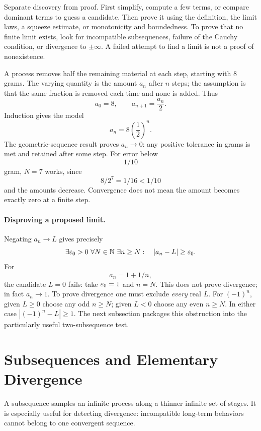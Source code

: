 \begin{remark}
Separate discovery from proof.  First simplify, compute a few terms, or
compare dominant terms to guess a candidate.  Then prove it using the
definition, the limit laws, a squeeze estimate, or monotonicity and
boundedness.  To prove that no finite limit exists, look for incompatible
subsequences, failure of the Cauchy condition, or divergence to
$\pm\infty$.  A failed attempt to find a limit is not a proof of
nonexistence.
\end{remark}


\begin{example}
A process removes half the remaining material at each step, starting
with $8$ grams. The varying quantity is the amount $a_n$ after $n$
steps; the assumption is that the same fraction is removed each time
and none is added. Thus
\[
a_0=8,
\qquad
a_{n+1}=\frac{a_n}{2}.
\]
Induction gives the model
\[
a_n=8\left(\frac12\right)^n.
\]
The geometric-sequence
result proves $a_n\to0$: any positive tolerance in grams is met
and retained after some step. For error below
\[
1/10
\]
 gram, $N=7$
works, since
\[
8/2^7=1/16<1/10
\]
 and the amounts decrease.
Convergence does not mean the amount becomes exactly zero at a finite step.
\end{example}

\paragraph{Disproving a proposed limit.}
Negating $a_n\to L$ gives precisely
\[
\exists\varepsilon_0>0\ \forall N\in\mathbb{N}\ \exists n\geq N:
\quad |a_n-L|\geq\varepsilon_0.
\]
For
\[
a_n=1+1/n,
\]
 the candidate $L=0$ fails: take $\varepsilon_0=1$ and
$n=N$. This does not prove divergence; in fact $a_n\to1$.
To prove divergence one must exclude \emph{every} real $L$.
For $(-1)^n$, given $L\geq0$ choose any odd $n\geq N$;
given $L<0$ choose any even $n\geq N$. In either case
$|(-1)^n-L|\geq1$. The next subsection packages this obstruction
into the particularly useful two-subsequence test.

\section{Subsequences and Elementary Divergence}

A subsequence samples an infinite process along a thinner infinite set of
stages.  It is especially useful for detecting divergence: incompatible
long-term behaviors cannot belong to one convergent sequence.

